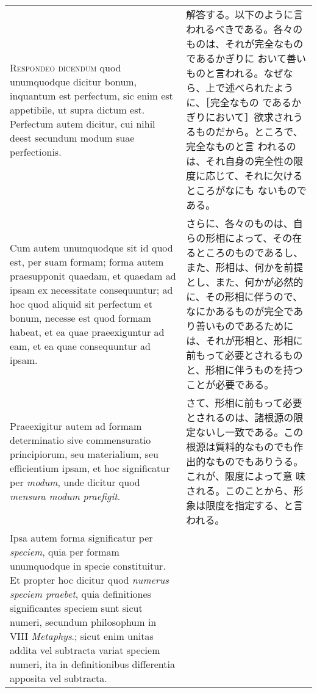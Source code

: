 \documentclass[10pt]{jsarticle}
\begin{document}
\begin{longtable}{p{21em}p{21em}}
\\


{\scshape Respondeo dicendum} quod unumquodque dicitur bonum, inquantum est
 perfectum, sic enim est appetibile, ut supra dictum est. Perfectum
 autem dicitur, cui nihil deest secundum modum suae perfectionis. 

&

解答する。以下のように言われるべきである。各々のものは、それが完全なものであるかぎりに
 おいて善いものと言われる。なぜなら、上で述べられたように、［完全なもの
 であるかぎりにおいて］欲求されうるものだから。ところで、完全なものと言
 われるのは、それ自身の完全性の限度に応じて、それに欠けるところがなにも
 ないものである。

\\

Cum autem unumquodque sit id quod est, per suam formam; forma autem
 praesupponit quaedam, et quaedam ad ipsam ex necessitate consequuntur;
 ad hoc quod aliquid sit perfectum et bonum, necesse est quod formam
 habeat, et ea quae praeexiguntur ad eam, et ea quae consequuntur ad
 ipsam.

&


さらに、各々のものは、自らの形相によって、その在るところのものであるし、
 また、形相は、何かを前提とし、また、何かが必然的に、その形相に伴うので、
 なにかあるものが完全であり善いものであるためには、それが形相と、形相に
 前もって必要とされるものと、形相に伴うものを持つことが必要である。

\\

Praeexigitur autem ad formam determinatio sive commensuratio
 principiorum, seu materialium, seu efficientium ipsam, et hoc
 significatur per {\itshape modum}, unde dicitur quod {\itshape mensura modum praefigit}.

&


さて、形相に前もって必要とされるのは、諸根源の限定ないし一致である。この
 根源は質料的なものでも作出的なものでもありうる。これが、限度によって意
 味される。このことから、形象は限度を指定する、と言われる。

\\

Ipsa autem forma significatur per {\itshape speciem}, quia per formam unumquodque
 in specie constituitur. Et propter hoc dicitur quod {\itshape numerus speciem
 praebet}, quia definitiones significantes speciem sunt sicut numeri,
 secundum philosophum in VIII {\itshape Metaphys}.; sicut enim unitas addita vel
 subtracta variat speciem numeri, ita in definitionibus differentia
 apposita vel subtracta. 


\end{longtable}
\end{document}
